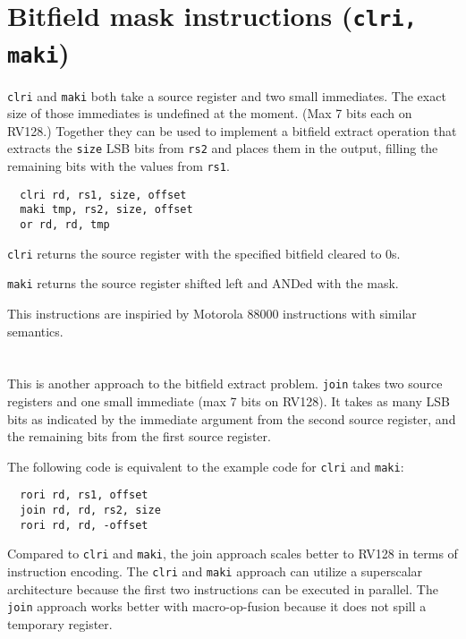 \section{Bitfield mask instructions (\texttt{clri, maki})}

{\tt clri} and {\tt maki} both take a source register and two small immediates.
The exact size of those immediates is undefined at the moment. (Max 7 bits each
on RV128.) Together they can be used to implement a bitfield extract operation
that extracts the {\tt size} LSB bits from {\tt rs2} and places them in the
output, filling the remaining bits with the values from {\tt rs1}.

\begin{verbatim}
  clri rd, rs1, size, offset
  maki tmp, rs2, size, offset
  or rd, rd, tmp
\end{verbatim}

{\tt clri} returns the source register with the specified bitfield cleared to 0s.

{\tt maki} returns the source register shifted left and ANDed with the mask.



This instructions are inspiried by Motorola 88000 instructions with similar semantics.


\section{}

This is another approach to the bitfield extract problem. {\tt join} takes two
source registers and one small immediate (max 7 bits on RV128). It takes as many
LSB bits as indicated by the immediate argument from the second source register,
and the remaining bits from the first source register.

The following code is equivalent to the example code for {\tt clri} and {\tt maki}:

\begin{verbatim}
  rori rd, rs1, offset
  join rd, rd, rs2, size
  rori rd, rd, -offset
\end{verbatim}



Compared to {\tt clri} and {\tt maki}, the join approach scales better to RV128
in terms of instruction encoding. The {\tt clri} and {\tt maki} approach can
utilize a superscalar architecture because the first two instructions can be
executed in parallel. The {\tt join} approach works better with
macro-op-fusion because it does not spill a temporary register.

